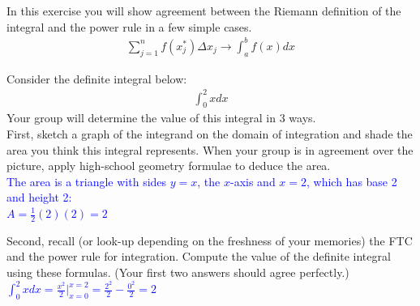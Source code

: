 \documentclass{ximera}
\begin{document}
\begin{exercise}
In this exercise you will show agreement between the Riemann definition of the integral and the power rule in a few simple cases. 
\begin{align}
	\sum_{j=1}^n f(x^*_{j})\Delta x_{j} \rightarrow \int_{a}^b f(x) dx \nonumber
\end{align}

Consider the definite integral below:
\begin{align}
	\int_{0}^2 x dx \nonumber
\end{align}
Your group will determine the value of this integral in 3 ways.\\
First, sketch a graph of the integrand on the domain of integration and shade the area you think this integral represents. When your group is in agreement over the picture, apply high-school geometry formulae to deduce the area.\\
\textcolor{blue}{The area is a triangle with sides $y=x$, the $x$-axis and $x=2$, which has base 2 and height 2: \\
$A=\frac{1}{2}(2)(2)=2$}
\end{exercise}

\begin{exercise}
    Second, recall (or look-up depending on the freshness of your memories) the FTC and the power rule for integration. Compute the value of the definite integral using these formulas. (Your first two answers should agree perfectly.)\\
    \textcolor{blue}{$\displaystyle\int_0^2 xdx=\frac{x^2}{2}\bigg|_{x=0}^{x=2}=\frac{2^2}{2}-\frac{0^2}{2}=2$}
\end{exercise}
\end{document}
